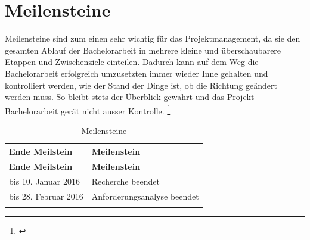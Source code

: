 \newpage

\section{Meilensteine}\label{meilensteine}

Meilensteine sind zum einen sehr wichtig für das Projektmanagement, da
sie den gesamten Ablauf der Bachelorarbeit in mehrere kleine und
überschaubarere Etappen und Zwischenziele einteilen. Dadurch kann auf
dem Weg die Bachelorarbeit erfolgreich umzusetzten immer wieder Inne
gehalten und kontrolliert werden, wie der Stand der Dinge ist, ob die
Richtung geändert werden muss. So bleibt stets der Überblick gewahrt und
das Projekt Bachelorarbeit gerät nicht ausser Kontrolle. \footnote{\autocite{meilensteine}}

\begin{longtable}[c]{@{}ll@{}}
\caption{Meilensteine}\tabularnewline
\toprule
\begin{minipage}[b]{0.37\columnwidth}\raggedright\strut
\textbf{Ende Meilstein}
\strut\end{minipage} &
\begin{minipage}[b]{0.26\columnwidth}\raggedright\strut
\textbf{Meilenstein}
\strut\end{minipage}\tabularnewline
\midrule
\endfirsthead
\toprule
\begin{minipage}[b]{0.37\columnwidth}\raggedright\strut
\textbf{Ende Meilstein}
\strut\end{minipage} &
\begin{minipage}[b]{0.26\columnwidth}\raggedright\strut
\textbf{Meilenstein}
\strut\end{minipage}\tabularnewline
\midrule
\endhead
\begin{minipage}[t]{0.37\columnwidth}\raggedright\strut
bis 10. Januar 2016
\strut\end{minipage} &
\begin{minipage}[t]{0.26\columnwidth}\raggedright\strut
Recherche beendet
\strut\end{minipage}\tabularnewline
\begin{minipage}[t]{0.37\columnwidth}\raggedright\strut
bis 28. Februar 2016
\strut\end{minipage} &
\begin{minipage}[t]{0.26\columnwidth}\raggedright\strut
Anforderungsanalyse beendet
\strut\end{minipage}\tabularnewline
\begin{minipage}[t]{0.37\columnwidth}\raggedright\strut

\end{minipage}
\end{longtable}
